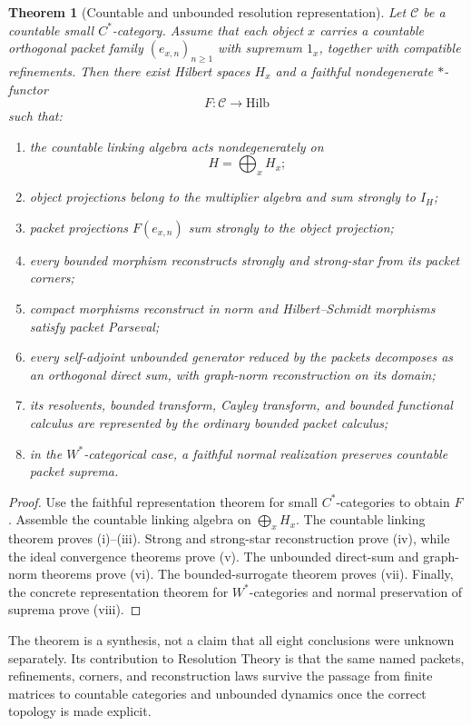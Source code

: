 \documentclass[11pt]{article}
\newtheorem{theorem}{Theorem}[section]
\theoremstyle{definition}
\theoremstyle{remark}
\begin{document}
\begin{theorem}[Countable and unbounded resolution representation]
Let $\mathcal C$ be a countable small $C^*$-category.  Assume that each object $x$ carries a countable orthogonal packet family $(e_{x,n})_{n\ge1}$ with supremum $1_x$, together with compatible refinements.  Then there exist Hilbert spaces $H_x$ and a faithful nondegenerate $*$-functor
\[
F:\mathcal C\to\mathrm{Hilb}
\]
such that:
\begin{enumerate}[label=\textup{(\roman*)}]
\item the countable linking algebra acts nondegenerately on
\[
H=\bigoplus_xH_x;
\]
\item object projections belong to the multiplier algebra and sum strongly to $I_H$;
\item packet projections $F(e_{x,n})$ sum strongly to the object projection;
\item every bounded morphism reconstructs strongly and strong-star from its packet corners;
\item compact morphisms reconstruct in norm and Hilbert--Schmidt morphisms satisfy packet Parseval;
\item every self-adjoint unbounded generator reduced by the packets decomposes as an orthogonal direct sum, with graph-norm reconstruction on its domain;
\item its resolvents, bounded transform, Cayley transform, and bounded functional calculus are represented by the ordinary bounded packet calculus;
\item in the $W^*$-categorical case, a faithful normal realization preserves countable packet suprema.
\end{enumerate}
\end{theorem}

\begin{proof}
Use the faithful representation theorem for small $C^*$-categories to obtain $F$.  Assemble the countable linking algebra on $\bigoplus_xH_x$.  The countable linking theorem proves (i)--(iii).  Strong and strong-star reconstruction prove (iv), while the ideal convergence theorems prove (v).  The unbounded direct-sum and graph-norm theorems prove (vi).  The bounded-surrogate theorem proves (vii).  Finally, the concrete representation theorem for $W^*$-categories and normal preservation of suprema prove (viii).
\end{proof}

The theorem is a synthesis, not a claim that all eight conclusions were unknown separately.  Its contribution to Resolution Theory is that the same named packets, refinements, corners, and reconstruction laws survive the passage from finite matrices to countable categories and unbounded dynamics once the correct topology is made explicit.
\end{document}
